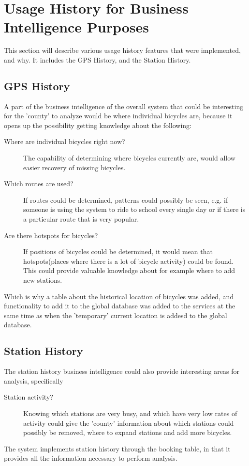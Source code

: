 \section{Usage History for Business Intelligence Purposes}
This section will describe various usage history features that were implemented, and why. It includes the GPS History, and the Station History.

\subsection{GPS History}
A part of the business intelligence of the overall system that could be interesting for the 'county' to analyze would be where individual bicycles are, because it opens up the possibility getting knowledge about the following:

\begin{description}
\item[Where are individual bicycles right now?] The capability of determining where bicycles currently are, would allow easier recovery of missing bicycles.
\item[Which routes are used?] If routes could be determined, patterns could possibly be seen, e.g. if someone is using the system to ride to school every single day or if there is a particular route that is very popular.
\item[Are there hotspots for bicycles?] If positions of bicycles could be determined, it would mean that hotspots(places where there is a lot of bicycle activity) could be found. This could provide valuable knowledge about for example where to add new stations.
\end{description}

Which is why a table about the historical location of bicycles was added, and functionality to add it to the global database was added to the services at the same time as when the 'temporary' current location is addesd to the global database.

\subsection{Station History}
The station history business intelligence could also provide interesting areas for analysis, specifically

\begin{description}
\item[Station activity?] Knowing which stations are very busy, and which have very low rates of activity could give the 'county' information about which stations could possibly be removed, where to expand stations and add more bicycles.
\end{description}

The system implements station history through the booking table, in that it provides all the information necessary to perform analysis.

